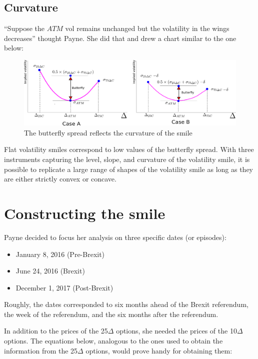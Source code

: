 \documentclass[]{book}
\providecommand{\tightlist}{%
  \setlength{\itemsep}{0pt}\setlength{\parskip}{0pt}}
\theoremstyle{definition}
\theoremstyle{definition}
\theoremstyle{definition}
\theoremstyle{remark}
\begin{document}
\section{Curvature}\label{curvature}

``Suppose the \(ATM\) vol remains unchanged but the volatility in the
wings decreases'' thought Payne. She did that and drew a chart similar
to the one below:

\begin{figure}
\includegraphics[width=1\linewidth]{images/figRRCurvature} \caption{The butterfly spread reflects the curvature of the smile}\label{fig:unnamed-chunk-29}
\end{figure}

Flat volatility smiles correspond to low values of the butterfly spread.
With three instruments capturing the level, slope, and curvature of the
volatility smile, it is possible to replicate a large range of shapes of
the volatility smile as long as they are either strictly convex or
concave.

\chapter{Constructing the smile}\label{constructing-the-smile}

Payne decided to focus her analysis on three specific dates (or
episodes):

\begin{itemize}
\tightlist
\item
  January 8, 2016 (Pre-Brexit)
\item
  June 24, 2016 (Brexit)
\item
  December 1, 2017 (Post-Brexit)
\end{itemize}

Roughly, the dates corresponded to six months ahead of the Brexit
referendum, the week of the referendum, and the six months after the
referendum.

In addition to the prices of the 25\(\Delta\) options, she needed the
prices of the 10\(\Delta\) options. The equations below, analogous to
the ones used to obtain the information from the 25\(\Delta\) options,
would prove handy for obtaining them:
\end{document}

